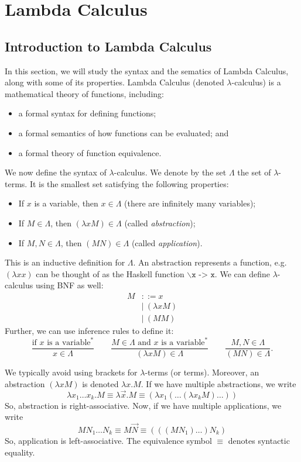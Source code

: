\documentclass[a4paper, openany]{memoir}
\theoremstyle{definition}
\begin{document}
    \chapter{Lambda Calculus}
    \section{Introduction to Lambda Calculus}
    In this section, we will study the syntax and the sematics of Lambda Calculus, along with some of its properties. Lambda Calculus (denoted $\lambda$-calculus) is a mathematical theory of functions, including:
    \begin{itemize}
        \item a formal syntax for defining functions;
        \item a formal semantics of how functions can be evaluated; and
        \item a formal theory of function equivalence.
    \end{itemize}

    We now define the syntax of $\lambda$-calculus. We denote by the set $\Lambda$ the set of $\lambda$-terms. It is the smallest set satisfying the following properties:    
    \begin{itemize}
        \item If $x$ is a variable, then $x \in \Lambda$ (there are infinitely many variables);
        \item If $M \in \Lambda$, then $(\lambda x M) \in \Lambda$ (called \emph{abstraction});
        \item If $M, N \in \Lambda$, then $(MN) \in \Lambda$ (called \emph{application}).
    \end{itemize}
    This is an inductive definition for $\Lambda$. An abstraction represents a function, e.g. $(\lambda x x)$ can be thought of as the Haskell function $\backslash \texttt{x -> x}$. We can define $\lambda$-calculus using BNF as well:
    \begin{align*}
        M &::= x \\
        &| \ (\lambda x M) \\
        &| \ (MM)
    \end{align*}
    Further, we can use inference rules to define it:
    \[\frac{\textrm{if } x \textrm{ is a variable}^*}{x \in \Lambda} \qquad \frac{M \in \Lambda \textrm{ and } x \textrm{ is a variable}^*}{(\lambda x M) \in \Lambda} \qquad \frac{M, N \in \Lambda}{(MN) \in \Lambda}.\]

    We typically avoid using brackets for $\lambda$-terms (or terms). Moreover, an abstraction $(\lambda x M)$ is denoted $\lambda x.M$. If we have multiple abstractions, we write
    \[\lambda x_1 \dots x_k . M \equiv \lambda \vec{x}. M \equiv (\lambda x_1 (\dots (\lambda x_k M) \dots ))\]
    So, abstraction is right-associative. Now, if we have multiple applications, we write
    \[M N_1 \dots N_k \equiv M \vec{N} \equiv (((M N_1) \dots ) N_k)\]
    So, application is left-associative. The equivalence symbol $\equiv$ denotes syntactic equality.
\end{document}
